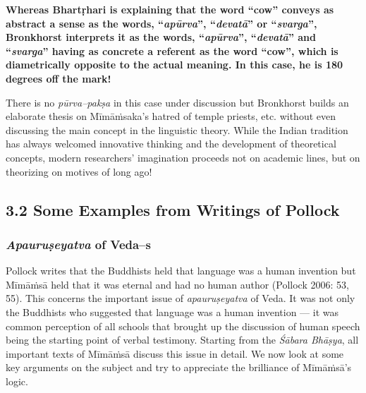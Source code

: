 \textbf{Whereas Bhartṛhari is explaining that the word “cow” conveys as abstract a sense as the words, “\textit{apūrva}”, “\textit{devatā}” or “\textit{svarga}”, Bronkhorst interprets it as the words, “\textit{apūrva}”, “\textit{devatā}” and “\textit{svarga}” having as concrete a referent as the word “cow”, which is diametrically opposite to the actual meaning. In this case, he is 180 degrees off the mark!}

There is no \textit{pūrva--pakṣa} in this case under discussion but Bronkhorst builds an elaborate thesis on Mīmāṁsaka’s hatred of temple priests, etc. without even discussing the main concept in the linguistic theory. While the Indian tradition has always welcomed innovative thinking and the development of theoretical concepts, modern researchers’ imagination proceeds not on academic lines, but on theorizing on motives of long ago!

\vspace{-.3cm}

\subsection*{3.2 Some Examples from Writings of Pollock}

\vspace{-.3cm}

\subsubsection*{\textit{Apauruṣeyatva} of Veda--s}

\vspace{-0.35cm}

Pollock writes that the Buddhists held that language was a human invention but Mīmāṁsā held that it was eternal and had no human author (Pollock 2006: 53, 55). This concerns the important issue of \textit{apauruṣeyatva} of Veda. It was not only the Buddhists who suggested that language was a human invention --- it was common perception of all schools that brought up the discussion of human speech being the starting point of verbal testimony. Starting from the \textit{Śābara Bhāṣya}, all important texts of Mīmāṁsā discuss this issue in detail. We now look at some key arguments on the subject and try to appreciate the brilliance of Mīmāṁsā’s logic.

